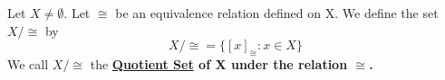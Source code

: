 \label{def:QuotientSet}
\newcommand{\QuotientSet}[0]{
    \bf \hyperref[def:QuotientSet]{Quotient Set} \rm
}
\newcommand{\QuoSet}[2]{
    #1
    /
    #2
}
\newcommand{\LetBeQuotientSet}[2]{
    Let \QuoSet{#1}{#2} be the \QuotientSet of #1 with respect to the relation #2.
}
\begin{df}  
    Let $X \neq \emptyset$.
    Let $\cong$ be an equivalence relation defined on X.
    We define the set $X/\cong$ by 
    \begin{equation}
        \QuoSet{X}{\cong} = \{ [x]_{\cong} : x \in X\}
    \end{equation}
    We call $\QuoSet{X}{\cong}$ the \QuotientSet of X under the relation $\cong$. 
\end{df} 